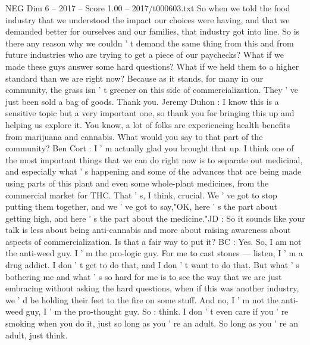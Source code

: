 \begin{textsample}{NEG Dim 6 – 2017 – Score 1.00 – 2017/t000603.txt}
So when we told the food industry that we understood the impact our choices were having, and that we demanded better for ourselves and our families, that industry got into line.
So is there any reason why we couldn ' t demand the same thing from this and from future industries who are trying to get a piece of our paychecks?
What if we made these guys answer some hard questions?
What if we held them to a higher standard than we are right now?
Because as it stands, for many in our community, the grass isn ' t greener on this side of commercialization.
They ' ve just been sold a bag of goods.
Thank you.
Jeremy Duhon : I know this is a sensitive topic but a very important one, so thank you for bringing this up and helping us explore it.
You know, a lot of folks are experiencing health benefits from marijuana and cannabis.
What would you say to that part of the community?
Ben Cort : I ' m actually glad you brought that up.
I think one of the most important things that we can do right now is to separate out medicinal, and especially what ' s happening and some of the advances that are being made using parts of this plant and even some whole-plant medicines, from the commercial market for THC.
That ' s, I think, crucial.
We ' ve got to stop putting them together, and we ' ve got to say,"OK, here ' s the part about getting high, and here ' s the part about the medicine."JD : So it sounds like your talk is less about being anti-cannabis and more about raising awareness about aspects of commercialization.
Is that a fair way to put it?
BC : Yes.
So, I am not the anti-weed guy.
I ' m the pro-logic guy.
For me to cast stones — listen, I ' m a drug addict.
I don ' t get to do that, and I don ' t want to do that.
But what ' s bothering me and what ' s so hard for me is to see the way that we are just embracing without asking the hard questions, when if this was another industry, we ' d be holding their feet to the fire on some stuff.
And no, I ' m not the anti-weed guy, I ' m the pro-thought guy.
So : think.
I don ' t even care if you ' re smoking when you do it, just so long as you ' re an adult.
So long as you ' re an adult, just think.

\end{textsample}
